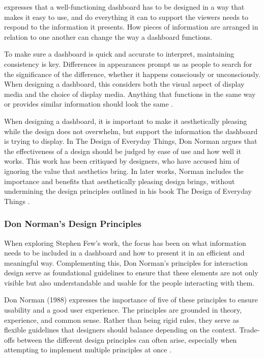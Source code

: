 \textcite{FewDashboard} expresses that a well-functioning dashboard has to be designed in a way that makes it easy to use, and do everything it can to support the viewers needs to respond to the information it presents. How pieces of information are arranged in relation to one another can change the way a dashboard functions.

To make sure a dashboard is quick and accurate to interpret, maintaining consistency is key. Differences in appearances prompt us as people to search for the significance of the difference, whether it happens consciously or unconsciously. When designing a dashboard, this considers both the visual aspect of display media and the choice of display media. Anything that functions in the same way or provides similar information should look the same \autocite[p. 143]{FewDashboard}.

When designing a dashboard, it is important to make it aesthetically pleasing while the design does not overwhelm, but support the information the dashboard is trying to display. In The Design of Everyday Things, Don Norman argues that the effectiveness of a design should be judged by ease of use and how well it works. This work has been critiqued by designers, who have accused him of ignoring the value that aesthetics bring. In later works, Norman includes the importance and benefits that aesthetically pleasing design brings, without undermining the design principles outlined in his book The Design of Everyday Things \autocite[p. 143]{FewDashboard}. 

\subsubsection{Don Norman's Design Principles}
\label{subsubsec:don_norman_design_principles}


When exploring Stephen Few’s work, the focus has been on what information needs to be included in a dashboard and how to present it in an efficient and meaningful way. Complementing this, Don Norman’s principles for interaction design serve as foundational guidelines to ensure that these elements are not only visible but also understandable and usable for the people interacting with them.

Don Norman (1988) expresses the importance of five of these principles to ensure usability and a good user experience. The principles are grounded in theory, experience, and common sense. Rather than being rigid rules, they serve as flexible guidelines that designers should balance depending on the context. Trade-offs between the different design principles can often arise, especially when attempting to implement multiple principles at once \autocite[p. 30]{sharp-2019}.

